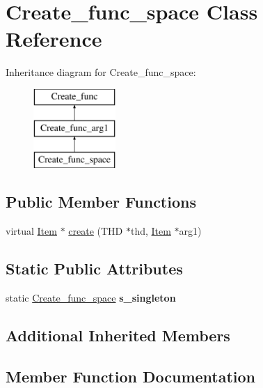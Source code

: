 \hypertarget{classCreate__func__space}{}\section{Create\+\_\+func\+\_\+space Class Reference}
\label{classCreate__func__space}
Inheritance diagram for Create\+\_\+func\+\_\+space\+:\begin{figure}[H]
\begin{center}
\leavevmode
\includegraphics[height=3.000000cm]{classCreate__func__space}
\end{center}
\end{figure}
\subsection*{Public Member Functions}
\begin{DoxyCompactItemize}
\item 
virtual \mbox{\hyperlink{classItem}{Item}} $\ast$ \mbox{\hyperlink{classCreate__func__space_ac574a2f70bdb0e641e6e1bd082159288}{create}} (T\+HD $\ast$thd, \mbox{\hyperlink{classItem}{Item}} $\ast$arg1)
\end{DoxyCompactItemize}
\subsection*{Static Public Attributes}
\begin{DoxyCompactItemize}
\item 
\mbox{\label{classCreate__func__space_afcd55858c393104fe2890d84b0a0d6b6}} 
static \mbox{\hyperlink{classCreate__func__space}{Create\+\_\+func\+\_\+space}} {\bfseries s\+\_\+singleton}
\end{DoxyCompactItemize}
\subsection*{Additional Inherited Members}


\subsection{Member Function Documentation}
\mbox{\label{classCreate__func__space_ac574a2f70bdb0e641e6e1bd082159288}} 

